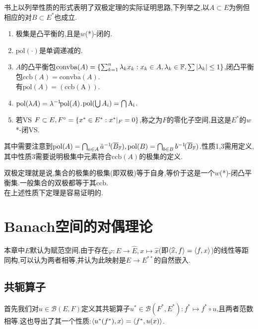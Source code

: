 \documentclass{article}
\newcommand{\mcBfunc}[1]{\mathcal{B}(#1)}
\begin{document}
书上以列举性质的形式表明了双极定理的实际证明思路,下列举之,以$A\subset E$为例但相应的对$B\subset E^*$也成立.
\begin{enumerate}
    \item 极集是凸平衡的,且是$w$(*)-闭的.
    \item $\mathrm{pol}(\cdot)$是单调递减的.
    \item $A$的凸平衡包$\mathrm{convba}(A)=\left\{\sum_{k=1}^n \lambda_kx_k:x_k\in A,\lambda_k\in \mathbb{F}, \sum\left|\lambda_k\right|\leq 1\right\}$,闭凸平衡包$\mathrm{ccb}(A)=\overline{\mathrm{convba}(A)}$.\\有$\mathrm{pol}(A)=\mathrm{(\mathrm{ccb}(A))}$.
    \item $\mathrm{pol}(\lambda A)=\lambda^{-1}\!\mathrm{pol}(A)$.$\mathrm{pol}\!\left(\bigcup A_i\right)=\bigcap\mathrm{A_i}$.
    \item 若VS $F\subset E, F^\circ=\left\{x^*\in E^*:x^*|_F=0\right\}$,称之为$F$的零化子空间,且这是$E^*$的$w$*-闭VS.
\end{enumerate}
其中需要注意到$\mathrm{pol}(A)=\bigcap_{a\in A}\hat{a}^{-1}\! (\overline{B}_{\mathbb{F}}), \mathrm{pol}(B)=\bigcap_{b\in B}b^{-1}\!(\overline{B}_{\mathbb{F}})$.性质1,3需用定义,其中性质3需要说明极集中元素符合$\mathrm{ccb}(A)$的极集的定义.

双极定理就是说,集合的极集的极集(即双极)等于自身,等价于这是一个$w$(*)-闭凸平衡集.一般集合的双极都等于其ccb.\\在上述性质下定理是容易证明的.\tbc

\section{Banach空间的对偶理论}
本章中$E$默认为赋范空间,由于存在$\varphi:E\to \widehat{E}, x\mapsto \hat{x}$(即$\left<\widehat{x},f\right>=\left<f,x\right>$)的线性等距同构,可以认为两者相等,并认为此映射是$E\to E^{**}$的自然嵌入.

\subsection{共轭算子}
首先我们对$u\in \mcBfunc{E,F}$定义其共轭算子$u^*\in\mcBfunc{F^*,E^*}:f^*\mapsto f^*\circ u$,且两者范数相等.这也导出了其一个性质:$\left<u^*(f^*),x\right>=\left<f^*,u(x)\right>$.

\end{document}
